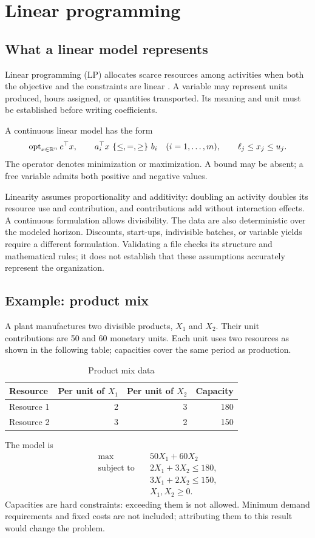\chapter{Linear programming}
\label{chap:pl}

\section{What a linear model represents}
Linear programming (LP) allocates scarce resources among activities when
both the objective and the constraints are linear
\cite{dantzig1963linear,bertsimas1997introduction}. A variable may represent
units produced, hours assigned, or quantities transported. Its meaning
and unit must be established before writing coefficients.

\begin{definicion}
A continuous linear model has the form
\[
 \operatorname{opt}_{x\in\mathbb{R}^n} c^\top x,\qquad
 a_i^\top x\ \{\leq,=,\geq\}\ b_i\quad(i=1,\ldots,m),\qquad
 \ell_j\leq x_j\leq u_j.
\]
The operator denotes minimization or maximization. A bound may be absent;
a free variable admits both positive and negative values.
\end{definicion}

Linearity assumes proportionality and additivity: doubling an activity
doubles its resource use and contribution, and contributions add without
interaction effects. A continuous formulation allows divisibility. The data
are also deterministic over the modeled horizon. Discounts, start-ups,
indivisible batches, or variable yields require a different formulation. Validating
a file checks its structure and mathematical rules; it does not establish that
these assumptions accurately represent the organization.

\section{Example: product mix}
A plant manufactures two divisible products, \(X_1\) and \(X_2\). Their unit
contributions are 50 and 60 monetary units. Each unit uses two resources as
shown in the following table; capacities cover the same period as production.
\begin{table}[htbp]
\centering
\caption{Product mix data}
\begin{tabular}{lrrr}
\toprule
Resource & Per unit of \(X_1\) & Per unit of \(X_2\) & Capacity \\
\midrule
Resource 1 & 2 & 3 & 180 \\
Resource 2 & 3 & 2 & 150 \\
\bottomrule
\end{tabular}
\end{table}
The model is
\[
\begin{aligned}
 \max\quad &50X_1+60X_2\\
 \text{subject to}\quad &2X_1+3X_2\leq180,\\
 &3X_1+2X_2\leq150,\\
 &X_1,X_2\geq0.
\end{aligned}
\]
Capacities are hard constraints: exceeding them is not allowed. Minimum
demand requirements and fixed costs are not included; attributing them to this
result would change the problem.

